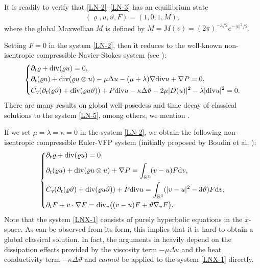 \documentclass[reqno,11pt]{amsart}
\theoremstyle{plain}
\numberwithin{equation}{section}
\begin{document}
It is readily to verify that \eqref{LN-2}--\eqref{LN-3} has an  equilibrium state 
\begin{align}\label{maxwell}
 (\varrho, u, \vartheta , F) = (1, 0, 1, M),  
\end{align}
  where the global Maxwellian $M$ is defined by
$
M=M(v)=(2\pi)^{- {3}/{2}}e^{- {|v|^2}/{2}}.    
$



Setting $F=0$ in the system \eqref{LN-2}, then it reduces to the well-known non-isentropic compressible
Navier-Stokes system (see \cite{MN-1980}):  
\begin{equation}\label{LN-5}
\left\{\begin{aligned}
& \partial_t \varrho+{\rm div}(\varrho u)=0, \\&\partial_t (\varrho u) + {\rm div} (\varrho u \otimes u) 
- \mu \Delta u - (\mu + \lambda)\nabla {\rm div} u + \nabla P=0, \\
& C_\textsl{v}(\partial_t (\varrho \vartheta ) 
+ {\rm div} (\varrho u \vartheta )) + P {\rm div} u  - \kappa \Delta \vartheta  - 2\mu |D(u)|^2 - \lambda|{\rm div} u|^2 =0.
\end{aligned}\right.\end{equation}  
There are many results on global well-posedess and time decay of classical solutions to the system \eqref{LN-5}, among others, we mention \cite{DJ-2018,MN-1980,MN-1983,KS-1999}.


 
 If we   set $\mu = \lambda=\kappa = 0$ in the system  \eqref{LN-2}, we obtain the 
 following  non-isentropic compressible Euler-VFP system  (initially  proposed by Boudin 
 et al. \cite{BBBGLLM-esaim-2009}):
\begin{equation}\label{LNX-1}  
\left\{  
\begin{aligned}  
&\partial_t \varrho + {\rm div} (\varrho u) = 0, \\  
&\partial_t (\varrho u) + {\rm div} (\varrho u \otimes u) + \nabla P = \int_{\mathbb{R}^3}
 (v-u)F\mathrm{d}v, \\  
&C_\textsl{v}(\partial_t (\varrho \vartheta ) + {\rm div} (\varrho u \vartheta )) + P {\rm div} u 
  = \int_{\mathbb{R}^3} (|v-u|^2 - 3\vartheta )F\mathrm{d}v, \\  
&\partial_t F + v \cdot \nabla F = {\rm div}_v\big((v-u)F + \vartheta \nabla_v F\big).  
\end{aligned}  
\right.  
\end{equation} 
Note that   the system    \eqref{LNX-1} consists of purely hyperbolic equations
  in the $x$-space. As can be observed from its form, this implies that it is hard to obtain a
   global classical solution. In fact, 
 the arguments in \cite{Mu-Wang-20,LNW-arXiv-2025} heavily depend on the dissipation effects
  provided by the viscosity  term  $-\mu \Delta u$ and the heat conductivity term 
   $-\kappa \Delta  \vartheta$ and \emph{cannot} be applied  to the system   
    \eqref{LNX-1} directly. 
 
\end{document}
